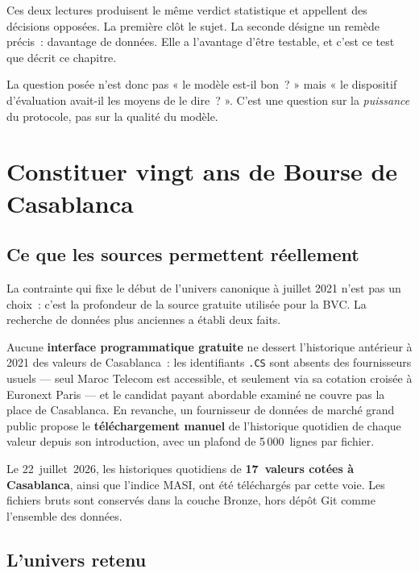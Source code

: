 Ces deux lectures produisent le même verdict statistique et appellent des
décisions opposées. La première clôt le sujet. La seconde désigne un remède
précis~: davantage de données. Elle a l'avantage d'être testable, et c'est ce
test que décrit ce chapitre.

\begin{remarquebox}
La question posée n'est donc pas « le modèle est-il bon~? » mais « le dispositif
d'évaluation avait-il les moyens de le dire~? ». C'est une question sur la
\emph{puissance} du protocole, pas sur la qualité du modèle.
\end{remarquebox}

\section{Constituer vingt ans de Bourse de Casablanca}

\subsection{Ce que les sources permettent réellement}

La contrainte qui fixe le début de l'univers canonique à juillet 2021 n'est pas
un choix~: c'est la profondeur de la source gratuite utilisée pour la BVC. La
recherche de données plus anciennes a établi deux faits.

Aucune \textbf{interface programmatique gratuite} ne dessert l'historique
antérieur à 2021 des valeurs de Casablanca~: les identifiants \texttt{.CS} sont
absents des fournisseurs usuels — seul Maroc Telecom est accessible, et
seulement via sa cotation croisée à Euronext Paris — et le candidat payant
abordable examiné ne couvre pas la place de Casablanca. En revanche, un
fournisseur de données de marché grand public propose le \textbf{téléchargement
manuel} de l'historique quotidien de chaque valeur depuis son introduction, avec
un plafond de 5\,000~lignes par fichier.

Le 22~juillet~2026, les historiques quotidiens de \textbf{17~valeurs cotées à
Casablanca}, ainsi que l'indice MASI, ont été téléchargés par cette voie. Les
fichiers bruts sont conservés dans la couche Bronze, hors dépôt Git comme
l'ensemble des données.

\subsection{L'univers retenu}

